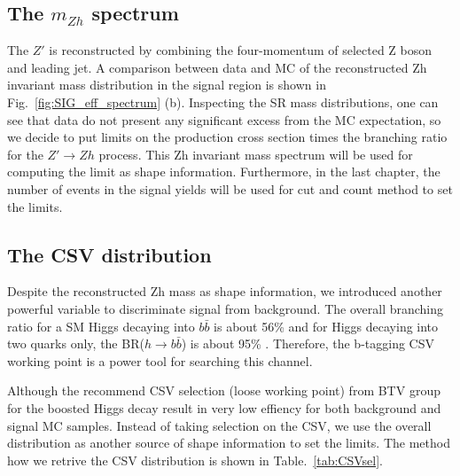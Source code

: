 \subsection{The $m_{Zh}$ spectrum}
The $Z'$ is reconstructed by combining the four-momentum of selected Z boson and leading jet. A comparison between data and MC of the reconstructed Zh invariant mass distribution in the signal region is shown in Fig.~\ref{fig:SIG_eff_spectrum} (b). Inspecting the SR mass distributions, one can see that data do not present any significant excess from the MC expectation, so we decide to put limits on the production cross section times the branching ratio for the $Z' \rightarrow Zh$ process. This Zh invariant mass spectrum will be used for computing the limit as shape information. Furthermore, in the last chapter, the number of events in the signal yields will be used for cut and count method to set the limits.

\newpage
\subsection{The CSV distribution}
Despite the reconstructed Zh mass as shape information, we introduced another powerful variable to discriminate signal from background. The overall branching ratio for a SM Higgs decaying into $b\bar{b}$ is about 56\% and for Higgs decaying into two quarks only, the BR($h\rightarrow b\bar{b}$) is about 95\% \cite{HiggsBR}. Therefore, the b-tagging CSV working point is a power tool for searching this channel.

Although the recommend CSV selection (loose working point) from BTV group\cite{BTV-13-001} for the boosted Higgs decay result in very low effiency for both background and signal MC samples. Instead of taking selection on the CSV, we use the overall distribution as another source of shape information to set the limits. The method how we retrive the CSV distribution is shown in Table.~\ref{tab:CSVsel}.

